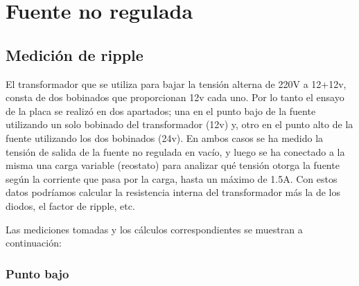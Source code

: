 \documentclass[chaptersright]{informeutn}
\begin{document}
    \section{Fuente no regulada}
    
     \subsection{Medición de ripple} 
        
        El transformador que se utiliza para bajar la tensión alterna de 220V a 12+12v, consta de dos bobinados que 
        proporcionan 12v cada uno. Por lo
        tanto el ensayo de la placa se realizó en dos apartados; una en el punto bajo de la fuente utilizando un solo
        bobinado del transformador (12v) y, otro en el punto alto de la fuente utilizando los dos bobinados (24v). En
        ambos casos se ha medido la tensión de salida de la fuente no regulada en vacío, y luego se ha conectado a la
        misma una carga variable (reostato) para analizar qué tensión otorga la fuente según la corriente que pasa por
        la carga, hasta un máximo de 1.5A. Con estos datos podríamos calcular la resistencia interna del transformador
        más la de los diodos, el factor de ripple, etc.
        
        Las mediciones tomadas y los cálculos correspondientes se muestran a continuación:

        \subsubsection{Punto bajo}
        
\end{document}
